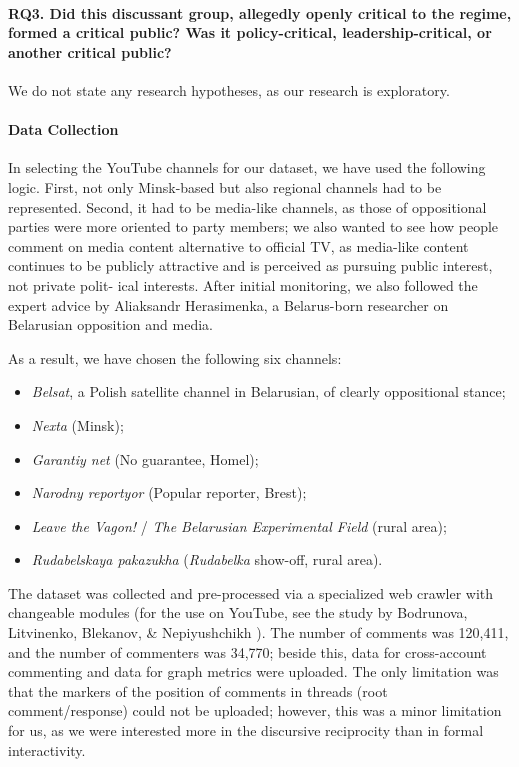 \paragraph{RQ3. Did this discussant group, allegedly openly critical to the regime, formed a critical public? Was it policy-critical, leadership-critical, or another critical public?}

We do not state any research hypotheses, as our research is exploratory.

\paragraph{Data Collection}
In selecting the YouTube channels for our dataset, we have used the following logic. First, not only Minsk-based but also regional channels had to be represented. Second, it had to be media-like channels, as those of oppositional parties were more oriented to party members; we also wanted to see how people comment on media content alternative to official TV, as media-like content continues to be publicly attractive and is perceived as pursuing public interest, not private polit- ical interests. After initial monitoring, we also followed the expert advice by Aliaksandr Herasimenka, a Belarus-born researcher on Belarusian opposition and media.

As a result, we have chosen the following six channels:
\begin{itemize}
	\item \textit{Belsat}, a Polish satellite channel in Belarusian, of clearly oppositional stance;
	\item \textit{Nexta} (Minsk);
	\item \textit{Garantiy net} (No guarantee, Homel);
	\item \textit{Narodny reportyor} (Popular reporter, Brest);
	\item \textit{Leave the Vagon!} / \textit{The Belarusian Experimental Field} (rural area);
	\item \textit{Rudabelskaya pakazukha} (\textit{Rudabelka} show-off, rural area).
\end{itemize}

The dataset was collected and pre-processed via a specialized web crawler with changeable modules \cite{BodrunovaLitvinenkoBlekanov2017} (for the use on YouTube, see the study by Bodrunova, Litvinenko, Blekanov, \& Nepiyushchikh \cite{BodrunovaLitvinenkoBlekanov2021}). The number of comments was 120,411, and the number of commenters was 34,770; beside this, data for cross-account commenting and data for graph metrics were uploaded. The only limitation was that the markers of the position of comments in threads (root comment/response) could not be uploaded; however, this was a minor limitation for us, as we were interested more in the discursive reciprocity than in formal interactivity.


